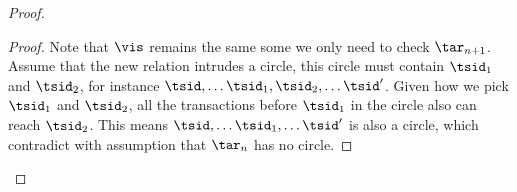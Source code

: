 \begin{proof}
\begin{proof}
    Note that \( \vis \) remains the same some we only need to check \( \tar_{n+1} \).
    Assume that the new relation intrudes a circle, this circle must contain \( \tsid_{1} \) and \( \tsid_{2} \), for instance \( \tsid, \dots \tsid_{1}, \tsid_{2}, \dots \tsid' \).
    Given how we pick \( \tsid_{1} \) and \( \tsid_{2} \), all the transactions before \( \tsid_{1} \) in the circle also can reach \( \tsid_{2} \).
    This means \( \tsid, \dots \tsid_{1}, \dots \tsid' \) is also a circle, which contradict with assumption that \( \tar_{n} \) has no circle.
\end{proof}

                                                                          



\end{proof}
